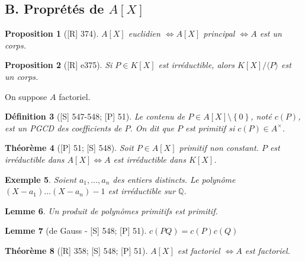 \documentclass[10pt, a4paper, parskip=full, twoside, twocolumn]{report}
\newtheorem{definition}{Définition}
\newtheorem{theorem}[definition]{Théorème}
\newtheorem{proposition}[definition]{Proposition}
\newtheorem{lemma}[definition]{Lemme}
\newtheorem{example}[definition]{Exemple}
\newcommand{\IQ}{\mathbb{Q}}
\begin{document}
\subsection*{B. Proprétés de $A[X]$}
\begin{proposition}[\textnormal{[R] 374}]
	$A[X]$ euclidien $\iff A[X]$ principal $\iff A$ est un corps.
\end{proposition}

\begin{proposition}[\textnormal{[R] e375}]
	Si $P\in K[X]$ est irréductible, alors $K[X]/\langle P\rangle$ est un corps.
\end{proposition}

\textcolor{paragraphtext}{On suppose $A$ factoriel.}

\begin{definition}[\textnormal{[S] 547-548; [P] 51}]
	Le \emph{contenu de $P\in A[X]\setminus \left\{0\right\}$}, noté $c(P)$, est un PGCD des coefficients de $P$.
	On dit que $P$ est \emph{primitif} si $c(P)\in A^{\times}$.
\end{definition}

\begin{theorem}[\textnormal{[P] 51; [S] 548}]
	Soit $P\in A[X]$ primitif non constant. $P$ est irréductible dans $A[X] \iff A$ est irréductible dans $K[X]$.
\end{theorem}

\begin{example}
	Soient $a_1,\dots,a_n$ des entiers distincts. Le polynôme $(X-a_1)\dots (X-a_n) - 1$ est irréductible sur $\IQ$.
\end{example}

\begin{lemma}
	Un produit de polynômes primitifs est primitif.
\end{lemma}

\begin{tcolorbox}[
    breakable, %
    colback=developpement, %
    colframe=gray!0!black, %
    boxrule=0pt, %
    arc=1mm, %
	boxsep=0pt,
	left=0pt, right=0pt, top=0pt, bottom=0pt
]
\begin{lemma}[de Gauss - \textnormal{[S] 548; [P] 51}]
\label{141dev1a}
	$c(PQ) = c(P)c(Q)$
\end{lemma}
\end{tcolorbox}

\begin{theorem}[\textnormal{[R] 358; [S] 548; [P] 51}]
	$A[X]$ est factoriel $\iff A$ est factoriel.
\end{theorem}
\end{document}
